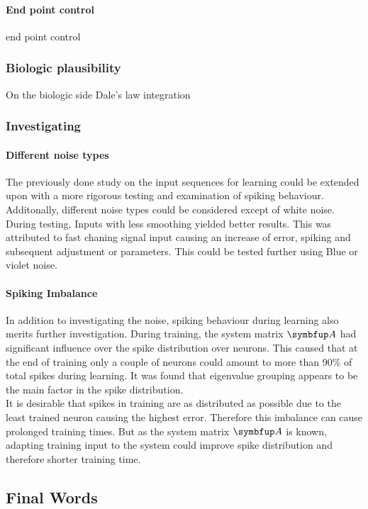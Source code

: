 \paragraph{End point control}
end point control

\subsubsection{Biologic plausibility}
On the biologic side
Dale's law integration
\subsubsection{Investigating}
\paragraph{Different noise types}
The previously done study on the input sequences for learning could be extended upon with a more rigorous testing and examination of spiking behaviour. Additonally, different noise types could be considered except of white noise. During testing, Inputs with less smoothing yielded better results. This was attributed to fast chaning signal input causing an increase of error, spiking and subsequent adjustment or parameters. This could be tested further using Blue or violet noise.
\paragraph{Spiking Imbalance}
In addition to investigating the noise, spiking behaviour during learning also merits further investigation. During training, the system matrix $\bmu{A}$ had significant influence over the spike distribution over neurons. This caused that at the end of training only a couple of neurons could amount to more than 90\% of total spikes during learning. It was found that eigenvalue grouping appears to be the main factor in the spike distribution.\\
It is desirable that spikes in training are as distributed as possible due to the least trained neuron causing the highest error. Therefore this imbalance can cause prolonged training times. But as the system matrix $\bmu{A}$ is known, adapting training input to the system could improve spike distribution and therefore shorter training time.\\
\subsection{Final Words}
\listoftodos



